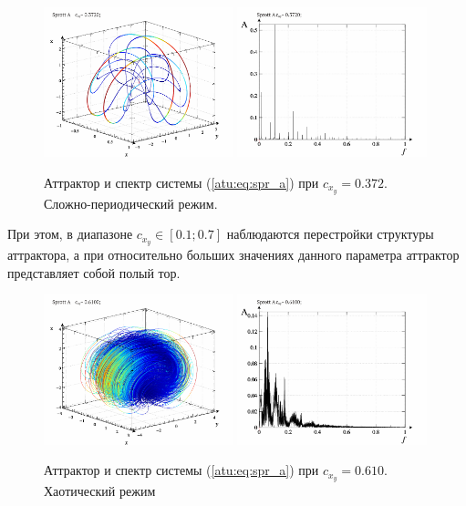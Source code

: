 \begin{figure}[htb!]
\centerline{
  \includegraphics[width=0.49\textwidth]{p/cha/spr_a/sprott_a-p_xyz_cx_y=0x372.png}
  \includegraphics[width=0.49\textwidth]{p/cha/spr_a/sprott_a_f-p_f_cx_y=0x372.png}
}
\caption{Аттрактор и спектр системы (\ref{atu:eq:spr_a}) при $ c_{x_y} =0.372 $.
  Сложно-периодический режим.
}
\label{atu:f:spr_a_p_0372}
\end{figure}

При этом, в диапазоне $c_{x_y} \in [0.1 ; 0.7] $
наблюдаются перестройки структуры аттрактора, а при относительно больших
значениях данного параметра аттрактор представляет собой полый тор.

\begin{figure}[htb!]
\centerline{
  \includegraphics[width=0.49\textwidth]{p/cha/spr_a/sprott_a-p_xyz_cx_y=0x610.png}
  \includegraphics[width=0.49\textwidth]{p/cha/spr_a/sprott_a_f-p_f_cx_y=0x610.png}
}
\caption{Аттрактор и спектр системы (\ref{atu:eq:spr_a}) при $ c_{x_y} =0.610 $.
  Хаотический режим
}
\label{atu:f:spr_a_p_0610}
\end{figure}




